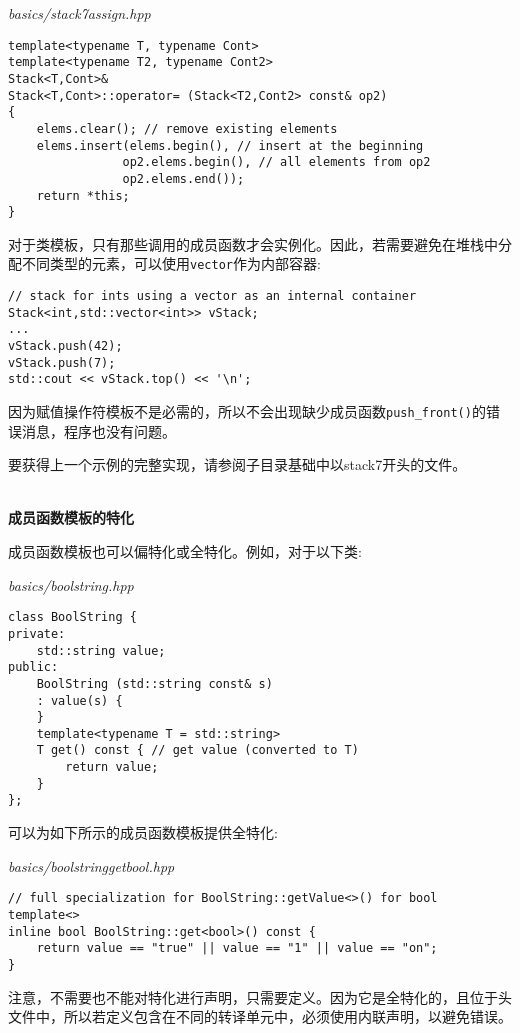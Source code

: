 \noindent
\textit{basics/stack7assign.hpp}
\begin{lstlisting}[style=styleCXX]
template<typename T, typename Cont>
template<typename T2, typename Cont2>
Stack<T,Cont>&
Stack<T,Cont>::operator= (Stack<T2,Cont2> const& op2)
{
	elems.clear(); // remove existing elements
	elems.insert(elems.begin(), // insert at the beginning
				op2.elems.begin(), // all elements from op2
				op2.elems.end());
	return *this;
}
\end{lstlisting}

对于类模板，只有那些调用的成员函数才会实例化。因此，若需要避免在堆栈中分配不同类型的元素，可以使用\texttt{vector}作为内部容器:

\begin{lstlisting}[style=styleCXX]
// stack for ints using a vector as an internal container
Stack<int,std::vector<int>> vStack;
...
vStack.push(42);
vStack.push(7);
std::cout << vStack.top() << '\n';
\end{lstlisting}

因为赋值操作符模板不是必需的，所以不会出现缺少成员函数\texttt{push\_front()}的错误消息，程序也没有问题。

要获得上一个示例的完整实现，请参阅子目录基础中以stack7开头的文件。

\hspace*{\fill} \\ %
\noindent
\textbf{成员函数模板的特化}

成员函数模板也可以偏特化或全特化。例如，对于以下类:

\noindent
\textit{basics/boolstring.hpp}
\begin{lstlisting}[style=styleCXX]
class BoolString {
private:
	std::string value;
public:
	BoolString (std::string const& s)
	: value(s) {
	}
	template<typename T = std::string>
	T get() const { // get value (converted to T)
		return value;
	}
};
\end{lstlisting}

可以为如下所示的成员函数模板提供全特化:

\noindent
\textit{basics/boolstringgetbool.hpp}
\begin{lstlisting}[style=styleCXX]
// full specialization for BoolString::getValue<>() for bool
template<>
inline bool BoolString::get<bool>() const {
	return value == "true" || value == "1" || value == "on";
}
\end{lstlisting}

注意，不需要也不能对特化进行声明，只需要定义。因为它是全特化的，且位于头文件中，所以若定义包含在不同的转译单元中，必须使用内联声明，以避免错误。

